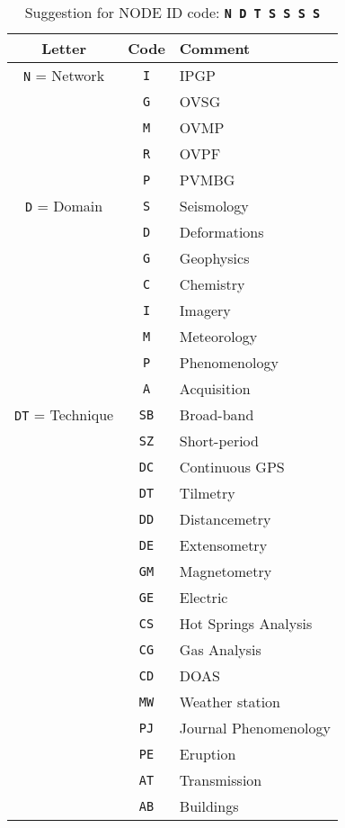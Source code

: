 
\begin{table}
\caption{Suggestion for NODE ID code: \texttt{\textbf{N D T S S S S}}}
\label{nodeidcodes}
\begin{center}
\begin{tabular}{|c|c|l|}
\hline
\textbf{Letter} & \textbf{Code} & \textbf{Comment}\\
\hline
\texttt{N} = Network         & \texttt{I}	&	IPGP\\
      			             & \texttt{G}	&	OVSG\\
      			             & \texttt{M}	&	OVMP\\
      			             & \texttt{R}	&	OVPF\\
      			             & \texttt{P}	&	PVMBG\\
\hline
\texttt{D} = Domain          & \texttt{S}	&	Seismology\\
      			             & \texttt{D}	&	Deformations\\
      			             & \texttt{G}	&	Geophysics\\
      			             & \texttt{C}	&	Chemistry\\
      			             & \texttt{I}	&	Imagery\\
      			             & \texttt{M}	&	Meteorology\\
      			             & \texttt{P}	&	Phenomenology\\
      			             & \texttt{A}	&	Acquisition\\
\hline
\texttt{DT} = Technique      & \texttt{SB}	&	Broad-band\\
      			             & \texttt{SZ}	&	Short-period\\
      			             & \texttt{DC}	&	Continuous GPS\\
      			             & \texttt{DT}	&	Tilmetry\\
      			             & \texttt{DD}	&	Distancemetry\\
      			             & \texttt{DE}	&	Extensometry\\
      			             & \texttt{GM}	&	Magnetometry\\
      			             & \texttt{GE}	&	Electric\\
      			             & \texttt{CS}	&	Hot Springs Analysis\\
      			             & \texttt{CG}	&	Gas Analysis\\
      			             & \texttt{CD}	&	DOAS\\
      			             & \texttt{MW}	&	Weather station\\
      			             & \texttt{PJ}	&	Journal Phenomenology\\
      			             & \texttt{PE}	&	Eruption\\
      			             & \texttt{AT}	&	Transmission\\
      			             & \texttt{AB}	&	Buildings\\
\hline
\end{tabular}
\end{center}
\end{table}

